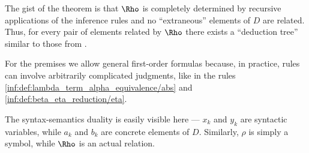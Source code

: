 \begin{comments}
  \item The gist of the theorem is that \( \Rho \) is completely determined by recursive applications of the inference rules and no \enquote{extraneous} elements of \( D \) are related. Thus, for every pair of elements related by \( \Rho \) there exists a \enquote{deduction tree} similar to those from .

  \item For the premises we allow general first-order formulas because, in practice, rules can involve arbitrarily complicated judgments, like in the rules \ref{inf:def:lambda_term_alpha_equivalence/abs} and \ref{inf:def:beta_eta_reduction/eta}.

  \item The syntax-semantics duality is easily visible here --- \( x_k \) and \( y_k \) are syntactic variables, while \( a_k \) and \( b_k \) are concrete elements of \( D \). Similarly, \( \rho \) is simply a symbol, while \( \Rho \) is an actual relation.
\end{comments}
